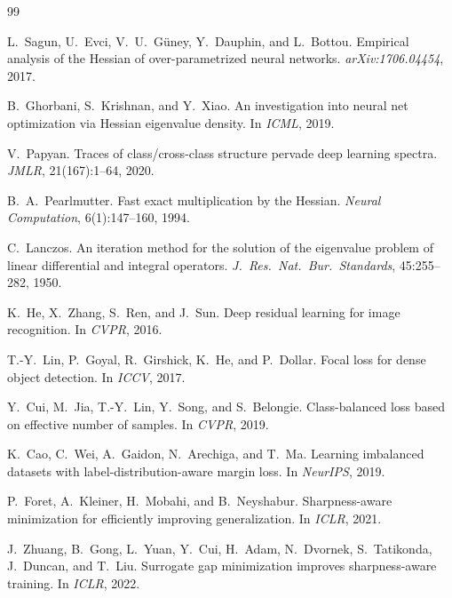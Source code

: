 \documentclass[11pt,a4paper]{article}
\begin{document}
\newpage


\begin{thebibliography}{99}

L.~Sagun, U.~Evci, V.~U.~G{\"u}ney, Y.~Dauphin, and L.~Bottou.
\newblock Empirical analysis of the Hessian of over-parametrized neural
  networks.
\newblock \emph{arXiv:1706.04454}, 2017.

B.~Ghorbani, S.~Krishnan, and Y.~Xiao.
\newblock An investigation into neural net optimization via {H}essian
  eigenvalue density.
\newblock In \emph{ICML}, 2019.

V.~Papyan.
\newblock Traces of class/cross-class structure pervade deep learning
  spectra.
\newblock \emph{JMLR}, 21(167):1--64, 2020.

B.~A.~Pearlmutter.
\newblock Fast exact multiplication by the {H}essian.
\newblock \emph{Neural Computation}, 6(1):147--160, 1994.

C.~Lanczos.
\newblock An iteration method for the solution of the eigenvalue problem
  of linear differential and integral operators.
\newblock \emph{J.\ Res.\ Nat.\ Bur.\ Standards}, 45:255--282, 1950.

K.~He, X.~Zhang, S.~Ren, and J.~Sun.
\newblock Deep residual learning for image recognition.
\newblock In \emph{CVPR}, 2016.

T.-Y.~Lin, P.~Goyal, R.~Girshick, K.~He, and P.~Dollar.
\newblock Focal loss for dense object detection.
\newblock In \emph{ICCV}, 2017.

Y.~Cui, M.~Jia, T.-Y.~Lin, Y.~Song, and S.~Belongie.
\newblock Class-balanced loss based on effective number of samples.
\newblock In \emph{CVPR}, 2019.

K.~Cao, C.~Wei, A.~Gaidon, N.~Arechiga, and T.~Ma.
\newblock Learning imbalanced datasets with label-distribution-aware
  margin loss.
\newblock In \emph{NeurIPS}, 2019.

P.~Foret, A.~Kleiner, H.~Mobahi, and B.~Neyshabur.
\newblock Sharpness-aware minimization for efficiently improving
  generalization.
\newblock In \emph{ICLR}, 2021.

J.~Zhuang, B.~Gong, L.~Yuan, Y.~Cui, H.~Adam, N.~Dvornek,
  S.~Tatikonda, J.~Duncan, and T.~Liu.
\newblock Surrogate gap minimization improves sharpness-aware training.
\newblock In \emph{ICLR}, 2022.


\end{thebibliography}
\end{document}
